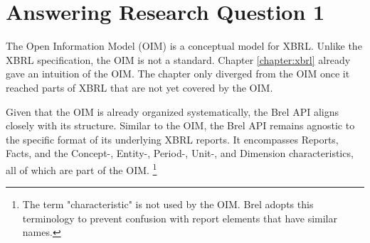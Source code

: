 \section{Answering Research Question 1}
\label{sec:answer_research_question_1}

The Open Information Model (OIM) is a conceptual model for XBRL.\cite{oim}
Unlike the XBRL specification, the OIM is not a standard.
Chapter \ref{chapter:xbrl} already gave an intuition of the OIM.
The chapter only diverged from the OIM once it reached parts of XBRL that are not yet covered by the OIM.

Given that the OIM is already organized systematically, the Brel API aligns closely with its structure. 
Similar to the OIM, the Brel API remains agnostic to the specific format of its underlying XBRL reports. 
It encompasses Reports, Facts, and the Concept-, Entity-, Period-, Unit-, and Dimension characteristics, 
all of which are part of the OIM. 
\footnote{The term "characteristic" is not used by the OIM. Brel adopts this terminology to prevent confusion with report elements that have similar names.}

